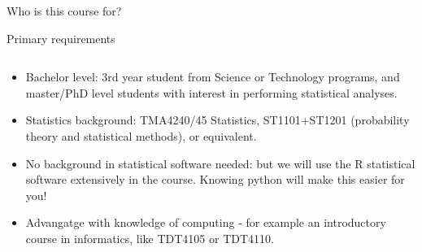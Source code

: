 \documentclass[10pt,ignorenonframetext,]{beamer}
\providecommand{\tightlist}{%
  \setlength{\itemsep}{0pt}\setlength{\parskip}{0pt}}
\begin{document}
\begin{frame}{Who is this course for?}
\protect\hypertarget{who-is-this-course-for}{}

\begin{block}{Primary requirements}

\(~\)

\begin{itemize}
\tightlist
\item
  Bachelor level: 3rd year student from Science or Technology programs,
  and master/PhD level students with interest in performing statistical
  analyses.
\end{itemize}

\vspace{2mm}

\begin{itemize}
\tightlist
\item
  Statistics background: TMA4240/45 Statistics, ST1101+ST1201
  (probability theory and statistical methods), or equivalent.
\end{itemize}

\vspace{2mm}

\begin{itemize}
\tightlist
\item
  No background in statistical software needed: but we will use the R
  statistical software extensively in the course. Knowing python will
  make this easier for you!
\end{itemize}

\vspace{2mm}

\begin{itemize}
\tightlist
\item
  Advangatge with knowledge of computing - for example an introductory
  course in informatics, like TDT4105 or TDT4110.
\end{itemize}

\end{block}

\end{frame}
\end{document}
